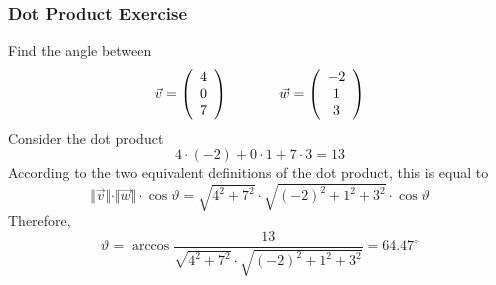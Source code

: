 \documentclass[xcolor=dvipsnames]{beamer}
\begin{document}

\begin{frame}
  \frametitle{Dot Product Exercise}
  {\ubung} Find the angle between
  \begin{equation}
    \label{eq:tauhohju}
    \vec{v}=\left(
      \begin{array}{c}
        4 \\
        0 \\
        7
      \end{array}\right)\hspace{.5in}\vec{w}=\left(
      \begin{array}{c}
        -2 \\
        1 \\
        3
      \end{array}\right)
  \end{equation}
  Consider the dot product
  \begin{equation}
    \label{eq:ijaquahd}
    4\cdot(-2)+0\cdot{}1+7\cdot{}3=13
  \end{equation}
According to the two equivalent definitions of the dot product, this
is equal to
\begin{equation}
  \label{eq:ohyizaeb}
  \Vert\vec{v}\Vert\cdot\Vert\vec{w}\Vert\cdot\cos\vartheta=\sqrt{4^{2}+7^{2}}\cdot\sqrt{(-2)^{2}+1^{2}+3^{2}}\cdot\cos\vartheta
\end{equation}
Therefore,
\begin{equation}
  \label{eq:yohsheen}
  \vartheta=\arccos\frac{13}{\sqrt{4^{2}+7^{2}}\cdot\sqrt{(-2)^{2}+1^{2}+3^{2}}}=64.47^{\circ}
\end{equation}
\end{frame}
\end{document}
